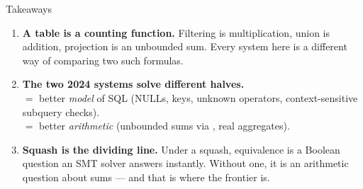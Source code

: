 \documentclass[9pt,aspectratio=169]{beamer}
\begin{document}
\begin{frame}[fragile]{Takeaways}
\begin{enumerate}
\item<1-> \textbf{A table is a counting function.} Filtering is multiplication, union is
      addition, projection is an unbounded sum. Every system here is a different way of
      comparing two such formulas.
\vspace{2mm}
\item<2-> \textbf{The two 2024 systems solve different halves.}\\
      \QED{} $=$ better \emph{model} of SQL (NULLs, keys, unknown operators, context-sensitive
      subquery checks).\\
      \sqlsolver{} $=$ better \emph{arithmetic} (unbounded sums via \liastar{}, real
      aggregates).
\vspace{2mm}
\item<3-> \textbf{Squash is the dividing line.} Under a squash, equivalence is a Boolean
      question an SMT solver answers instantly. Without one, it is an arithmetic question
      about sums --- and that is where the frontier is.
\end{enumerate}
\vspace{4mm}
\end{frame}
\end{document}
